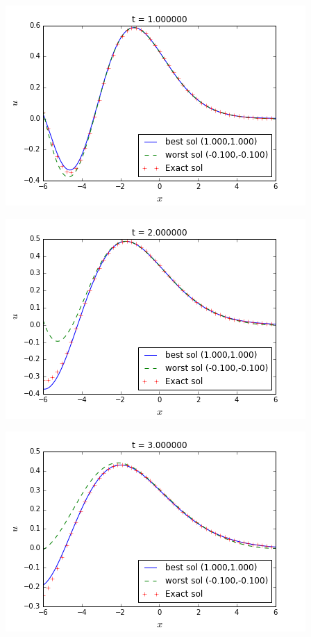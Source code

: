 \begin{minipage}{.5\linewidth}
\centering
\includegraphics[scale=.5]{figures/firstTestsP0Snap2.png}
\end{minipage}
\begin{minipage}{.5\linewidth}
\centering
	\includegraphics[scale=.5]{figures/firstTestsP0Snap3.png}
\end{minipage}
\begin{minipage}{.5\linewidth}
\centering
\includegraphics[scale=.5]{figures/firstTestsP0Snap4.png}
\end{minipage}
